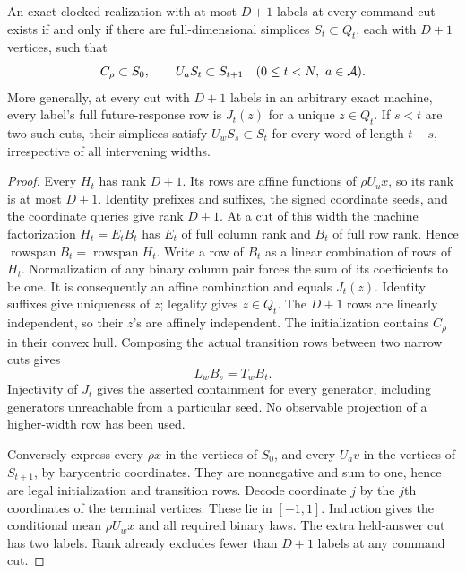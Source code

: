 \begin{theorem}\label{thm:simplex50}
An exact clocked realization with at most $D+1$ labels at every command
cut exists if and only if there are full-dimensional simplices
$S_t\subset Q_t$, each with $D+1$ vertices, such that
\begin{equation}\label{eq:simplex50}
 C_\rho\subset S_0,\qquad U_aS_t\subset S_{t+1}
       \quad(0\le t<N,\ a\in\mathcal A).
\end{equation}
More generally, at every cut with $D+1$ labels in an arbitrary exact
machine, every label's full future-response row is $J_t(z)$ for a
unique $z\in Q_t$. If $s<t$ are two such cuts, their simplices satisfy
$U_wS_s\subset S_t$ for every word of length $t-s$, irrespective of
all intervening widths.
\end{theorem}
\begin{proof}
Every $H_t$ has rank $D+1$. Its rows are affine functions of
$\rho U_ux$, so its rank is at most $D+1$. Identity prefixes and suffixes,
the signed coordinate seeds, and the coordinate queries give rank
$D+1$. At a cut of this width the machine factorization $H_t=E_tB_t$
has $E_t$ of full column rank and $B_t$ of full row rank. Hence
$\operatorname{rowspan}B_t=\operatorname{rowspan}H_t$. Write a row of
$B_t$ as a linear combination of rows of $H_t$. Normalization of any
binary column pair forces the sum of its coefficients to be one.
It is consequently an affine combination and equals $J_t(z)$.
Identity suffixes give uniqueness of $z$; legality gives $z\in Q_t$.
The $D+1$ rows are linearly independent, so their $z$'s are affinely
independent. The initialization contains $C_\rho$ in their convex hull.
Composing the actual transition rows between two narrow cuts gives
\[
 L_wB_s=T_wB_t.
\]
Injectivity of $J_t$ gives the asserted containment for every generator,
including generators unreachable from a particular seed. No observable
projection of a higher-width row has been used.

Conversely express every $\rho x$ in the vertices of $S_0$, and every
$U_av$ in the vertices of $S_{t+1}$, by barycentric coordinates. They
are nonnegative and sum to one, hence are legal initialization and
transition rows. Decode coordinate $j$ by the $j$th coordinates of
the terminal vertices. These lie in $[-1,1]$. Induction gives the
conditional mean $\rho U_wx$ and all required binary laws. The extra
held-answer cut has two labels. Rank already excludes fewer than
$D+1$ labels at any command cut.
\end{proof}

